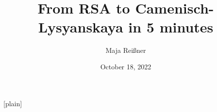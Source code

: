 


\usepackage{outlines}
\usepackage{appendixnumberbeamer}
\usepackage{array}
\usepackage{booktabs}

\usepackage{xspace} 
\newcommand{\themename}{\textbf{\textsc{metropolis}}\xspace}

\usepackage{tikz}
\usepackage{amsmath}
\usepackage{mathtools}
\usepackage{wrapfig}
\usepackage{makecell}
\usepackage[makeroom]{cancel}
\usepackage{xcolor}
\usepackage{calc}
\usepackage{pgfpages}

\def\XLR#1{\xleftrightarrow[\rule{1.5cm}{0pt}]{#1}}%
\def\XR#1{\xrightarrow[\rule{1.5cm}{0pt}]{#1}}
\def\XL#1{\xleftarrow[\rule{1.5cm}{0pt}]{#1}}

[plain]

\makeatletter
\newif\ifOnBeamerModeTransition
\newcommand{\slideselection}{1-}%
\newenvironment{handoutframeselect}[1][1-]{%
  \begingroup%
  \mode<handout>{%
    \gdef\beamer@currentmode{beamer}%
    \OnBeamerModeTransitiontrue%
    \renewcommand{\slideselection}{#1}}%
}{%
  \ifOnBeamerModeTransition%
    \OnBeamerModeTransitionfalse%
    \gdef\beamer@currentmode{handout}%
  \fi%
  \endgroup%
}
\makeatother

\renewcommand{\includegraphics}[2][]{\OldIncludegraphics[height=0.8\textheight,keepaspectratio, #1]{#2}}

\usepackage{textpos}


\title{From RSA to Camenisch-Lysyanskaya in 5 minutes}
\subtitle{}
\date{October 18, 2022}
\author{Maja Reißner}
\institute{}

